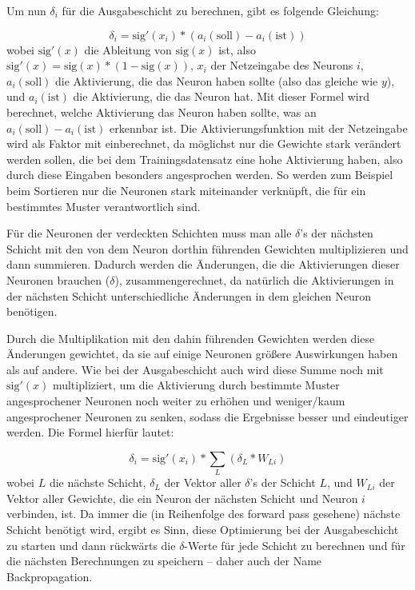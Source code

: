 \documentclass[10pt]{article}
\newcommand{\sig}{\textrm{sig}}
\newcommand{\netin}{\textrm{net}}
\newcommand{\form}[1]{#1}
\newcommand{\feng}[1]{{#1}}
\begin{document}
Um nun $\delta_i$ für die Ausgabeschicht zu berechnen, gibt es folgende Gleichung: 

\form{\[
	\delta_i = \sig '\left(x_i\right) * (a_i (\textrm{soll}) - a_i (\textrm{ist})) 
\]}
%
wobei $\sig '(x)$ die Ableitung von $\sig(x)$ ist, also $\sig'(x) = \sig(x) * (1 - \sig(x))$, $x_i$ der Netzeingabe des Neurons $i$, $a_i(\textrm{soll})$ die Aktivierung, die das Neuron haben sollte (also das gleiche wie $y$), und $a_i(\textrm{ist})$ die Aktivierung, die das Neuron hat.
%
Mit dieser Formel wird berechnet, welche Aktivierung das Neuron haben sollte, was an $a_i(\textrm{soll}) - a_i(\textrm{ist})$ erkennbar ist. Die Aktivierungsfunktion mit der Netzeingabe wird als Faktor mit einberechnet, da möglichst nur die Gewichte stark verändert werden sollen, die bei dem Trainingsdatensatz eine hohe Aktivierung haben, also durch diese Eingaben besonders angesprochen werden. So werden zum Beispiel beim Sortieren nur die Neuronen stark miteinander verknüpft, die für ein bestimmtes Muster verantwortlich sind.

Für die Neuronen der verdeckten Schichten muss man alle $\delta$'s der nächsten Schicht mit den von dem Neuron dorthin führenden Gewichten multiplizieren und dann summieren. Dadurch werden die Änderungen, die die Aktivierungen dieser Neuronen brauchen ($\delta$), zusammengerechnet, da natürlich die Aktivierungen in der nächsten Schicht unterschiedliche Änderungen in dem gleichen Neuron benötigen.
	
Durch die Multiplikation mit den dahin führenden Gewichten werden diese Änderungen gewichtet, da sie auf einige Neuronen größere Auswirkungen haben als auf andere. Wie bei der Ausgabeschicht auch wird diese Summe noch mit $\sig'(x)$ multipliziert, um die Aktivierung durch bestimmte Muster angesprochener Neuronen noch weiter zu erhöhen und weniger/kaum angesprochener Neuronen zu senken, sodass die Ergebnisse besser und eindeutiger werden. Die Formel hierfür lautet:

\form{\[\delta_i = \sig'(x_i) * \sum_{L}{\left(\delta_L\ast W_{Li}\right)}\]}
%
\noindent wobei $L$ die nächste Schicht, $\delta_L$ der Vektor aller $\delta$'s der Schicht $L$, und $W_{Li}$ der Vektor aller Gewichte, die ein Neuron der nächsten Schicht und Neuron $i$ verbinden, ist.
%
Da immer die (in Reihenfolge des \feng{forward pass} gesehene) nächste Schicht benötigt wird, ergibt es Sinn, diese Optimierung bei der Ausgabeschicht zu starten und dann rückwärts die \mbox{$\delta$-Werte} für jede Schicht zu berechnen und für die nächsten Berechnungen zu speichern -- daher auch der Name Backpropagation.
\end{document}
